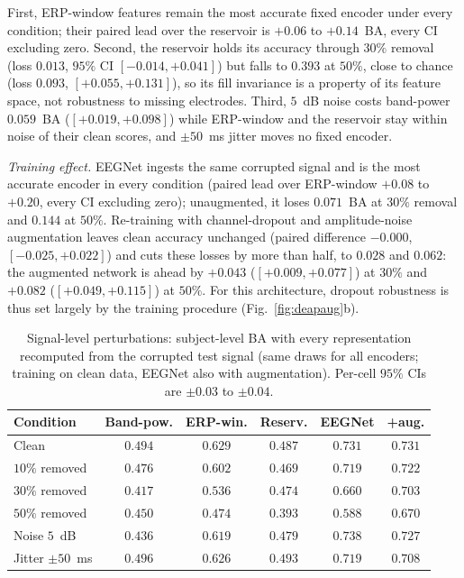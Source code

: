 \documentclass[conference]{IEEEtran}
\begin{document}
First, ERP-window features remain the most accurate fixed encoder under every condition; their paired lead over the reservoir is $+0.06$ to $+0.14$~BA, every CI excluding zero. Second, the reservoir holds its accuracy through $30\%$ removal (loss $0.013$, $95\%$ CI $[-0.014,+0.041]$) but falls to $0.393$ at $50\%$, close to chance (loss $0.093$, $[+0.055,+0.131]$), so its fill invariance is a property of its feature space, not robustness to missing electrodes. Third, $5$~dB noise costs band-power $0.059$~BA ($[+0.019,+0.098]$) while ERP-window and the reservoir stay within noise of their clean scores, and $\pm50$~ms jitter moves no fixed encoder.

\emph{Training effect.} EEGNet ingests the same corrupted signal and is the most accurate encoder in every condition (paired lead over ERP-window $+0.08$ to $+0.20$, every CI excluding zero); unaugmented, it loses $0.071$~BA at $30\%$ removal and $0.144$ at $50\%$. Re-training with channel-dropout and amplitude-noise augmentation leaves clean accuracy unchanged (paired difference $-0.000$, $[-0.025,+0.022]$) and cuts these losses by more than half, to $0.028$ and $0.062$: the augmented network is ahead by $+0.043$ ($[+0.009,+0.077]$) at $30\%$ and $+0.082$ ($[+0.049,+0.115]$) at $50\%$. For this architecture, dropout robustness is thus set largely by the training procedure (Fig.~\ref{fig:deapaug}b).

\begin{table}[t]
\caption{Signal-level perturbations: subject-level BA with every representation recomputed from the corrupted test signal (same draws for all encoders; training on clean data, EEGNet also with augmentation). Per-cell $95\%$ CIs are $\pm0.03$ to $\pm0.04$.}
\label{tab:rawsignal}
\centering
\small
\setlength{\tabcolsep}{3pt}
\begin{tabular}{lccccc}
\toprule
Condition & Band-pow. & ERP-win. & Reserv. & EEGNet & +aug. \\
\midrule
Clean & $0.494$ & $0.629$ & $0.487$ & $0.731$ & $0.731$ \\
$10\%$ removed & $0.476$ & $0.602$ & $0.469$ & $0.719$ & $0.722$ \\
$30\%$ removed & $0.417$ & $0.536$ & $0.474$ & $0.660$ & $0.703$ \\
$50\%$ removed & $0.450$ & $0.474$ & $0.393$ & $0.588$ & $0.670$ \\
Noise $5$~dB & $0.436$ & $0.619$ & $0.479$ & $0.738$ & $0.727$ \\
Jitter $\pm50$~ms & $0.496$ & $0.626$ & $0.493$ & $0.719$ & $0.708$ \\
\bottomrule
\end{tabular}
\end{table}
\end{document}
